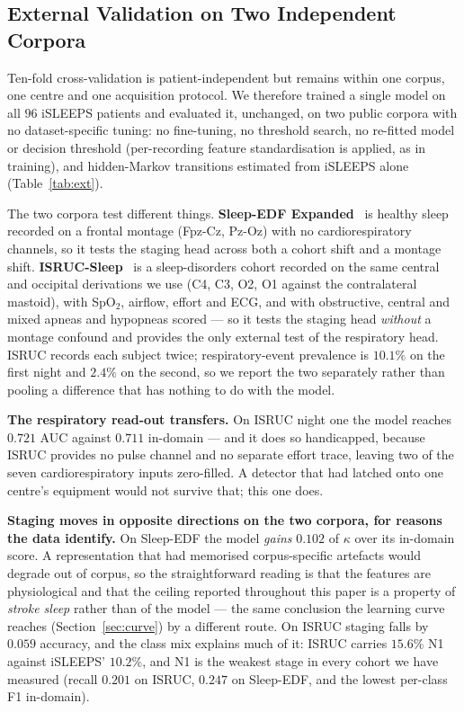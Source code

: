 \documentclass[journal]{IEEEtran}
\newcommand{\mmAuc}{0.711}
\begin{document}
\subsection{External Validation on Two Independent Corpora}
\label{sec:external}
Ten-fold cross-validation is patient-independent but remains within one corpus, one centre
and one acquisition protocol. We therefore trained a single model on all $96$ iSLEEPS
patients and evaluated it, unchanged, on two public corpora with no dataset-specific
tuning: no fine-tuning, no threshold search, no re-fitted model or decision threshold (per-recording feature standardisation is applied, as in training), and hidden-Markov
transitions estimated from iSLEEPS alone (Table~\ref{tab:ext}).

The two corpora test different things. \textbf{Sleep-EDF Expanded}~\cite{kemp2000sleepedf}
is healthy sleep recorded on a frontal montage (Fpz-Cz, Pz-Oz) with no cardiorespiratory
channels, so it tests the staging head across both a cohort shift and a montage shift.
\textbf{ISRUC-Sleep}~\cite{khalighi2016isruc} is a sleep-disorders cohort recorded on the
same central and occipital derivations we use (C4, C3, O2, O1 against the contralateral
mastoid), with SpO$_2$, airflow, effort and ECG, and with obstructive, central and mixed
apneas and hypopneas scored --- so it tests the staging head \emph{without} a montage
confound and provides the only external test of the respiratory head. ISRUC records each
subject twice; respiratory-event prevalence is $10.1\%$ on the first night and $2.4\%$ on
the second, so we report the two separately rather than pooling a difference that has
nothing to do with the model.

\textbf{The respiratory read-out transfers.} On ISRUC night one the model reaches $0.721$
AUC against $\mmAuc$ in-domain --- and it does so handicapped, because ISRUC provides no
pulse channel and no separate effort trace, leaving two of the seven cardiorespiratory
inputs zero-filled. A detector that had latched onto one centre's equipment would not
survive that; this one does.

\textbf{Staging moves in opposite directions on the two corpora, for reasons the data
identify.} On Sleep-EDF the model \emph{gains} $0.102$ of $\kappa$ over its in-domain
score. A representation that had memorised corpus-specific artefacts would degrade out of
corpus, so the straightforward reading is that the features are physiological and that the
ceiling reported throughout this paper is a property of \emph{stroke sleep} rather than of
the model --- the same conclusion the learning curve reaches (Section~\ref{sec:curve}) by a
different route. On ISRUC staging falls by $0.059$ accuracy, and the class mix explains
much of it: ISRUC carries $15.6\%$ N1 against iSLEEPS' $10.2\%$, and N1 is the weakest
stage in every cohort we have measured (recall $0.201$ on ISRUC, $0.247$ on Sleep-EDF, and
the lowest per-class F1 in-domain).
\end{document}
